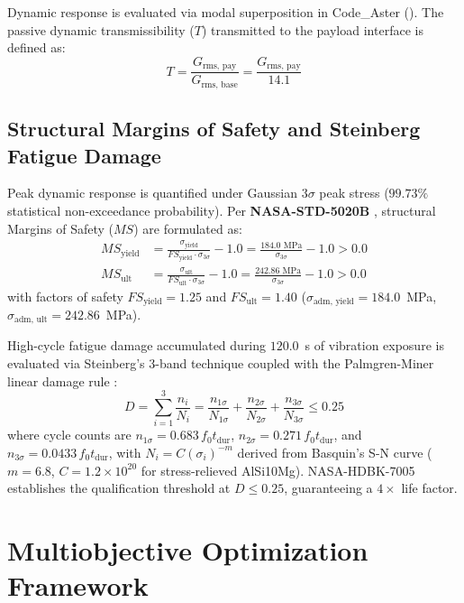 \documentclass[preprint,12pt,3p]{elsarticle}
\newcommand{\code}[1]{\texttt{\detokenize{#1}}}
\newcommand{\Grmspay}{G_{\text{rms, pay}}}
\newcommand{\Grmsbase}{G_{\text{rms, base}}}
\begin{document}
Dynamic response is evaluated via modal superposition in Code\_Aster (\code{DYNA_ALEA_MODAL}). The passive dynamic transmissibility ($T$) transmitted to the payload interface is defined as:
\begin{equation}
  T = \frac{\Grmspay}{\Grmsbase} = \frac{\Grmspay}{14.1}
  \label{eq:transmissibility}
\end{equation}

\subsection{Structural Margins of Safety and Steinberg Fatigue Damage}
Peak dynamic response is quantified under Gaussian $3\sigma$ peak stress ($99.73\%$ statistical non-exceedance probability). Per \textbf{NASA-STD-5020B} \cite{nasa2022}, structural Margins of Safety ($MS$) are formulated as:
\begin{align}
  MS_{\text{yield}} &= \frac{\sigma_{\text{yield}}}{FS_{\text{yield}} \cdot \sigma_{3\sigma}} - 1.0 = \frac{184.0\text{ MPa}}{\sigma_{3\sigma}} - 1.0 > 0.0 \label{eq:ms-yield} \\
  MS_{\text{ult}} &= \frac{\sigma_{\text{ult}}}{FS_{\text{ult}} \cdot \sigma_{3\sigma}} - 1.0 = \frac{242.86\text{ MPa}}{\sigma_{3\sigma}} - 1.0 > 0.0 \label{eq:ms-ult}
\end{align}
with factors of safety $FS_{\text{yield}} = 1.25$ and $FS_{\text{ult}} = 1.40$ ($\sigma_{\text{adm, yield}} = 184.0$~MPa, $\sigma_{\text{adm, ult}} = 242.86$~MPa).

High-cycle fatigue damage accumulated during $120.0$~s of vibration exposure is evaluated via Steinberg's 3-band technique coupled with the Palmgren-Miner linear damage rule \cite{steinberg2000,nasa2001}:
\begin{equation}
  D = \sum_{i=1}^{3} \frac{n_i}{N_i} = \frac{n_{1\sigma}}{N_{1\sigma}} + \frac{n_{2\sigma}}{N_{2\sigma}} + \frac{n_{3\sigma}}{N_{3\sigma}} \le 0.25
  \label{eq:steinberg}
\end{equation}
where cycle counts are $n_{1\sigma} = 0.683\, f_0 t_{\text{dur}}$, $n_{2\sigma} = 0.271\, f_0 t_{\text{dur}}$, and $n_{3\sigma} = 0.0433\, f_0 t_{\text{dur}}$, with $N_i = C (\sigma_i)^{-m}$ derived from Basquin's S-N curve ($m = 6.8$, $C = 1.2 \times 10^{20}$ for stress-relieved AlSi10Mg). NASA-HDBK-7005 establishes the qualification threshold at $D \le 0.25$, guaranteeing a $4\times$ life factor.

\section{Multiobjective Optimization Framework}
\label{sec:optimization}
\end{document}
